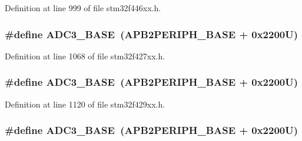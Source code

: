 Definition at line 999 of file stm32f446xx.\+h.

\subsubsection[{\texorpdfstring{A\+D\+C3\+\_\+\+B\+A\+SE}{ADC3_BASE}}]{\setlength{\rightskip}{0pt plus 5cm}\#define A\+D\+C3\+\_\+\+B\+A\+SE~({\bf A\+P\+B2\+P\+E\+R\+I\+P\+H\+\_\+\+B\+A\+SE} + 0x2200\+U)}\hypertarget{group___peripheral__memory__map_gaca766f86c8e0b00a8e2b0224dcbb4c82}{}\label{group___peripheral__memory__map_gaca766f86c8e0b00a8e2b0224dcbb4c82}


Definition at line 1068 of file stm32f427xx.\+h.

\subsubsection[{\texorpdfstring{A\+D\+C3\+\_\+\+B\+A\+SE}{ADC3_BASE}}]{\setlength{\rightskip}{0pt plus 5cm}\#define A\+D\+C3\+\_\+\+B\+A\+SE~({\bf A\+P\+B2\+P\+E\+R\+I\+P\+H\+\_\+\+B\+A\+SE} + 0x2200\+U)}\hypertarget{group___peripheral__memory__map_gaca766f86c8e0b00a8e2b0224dcbb4c82}{}\label{group___peripheral__memory__map_gaca766f86c8e0b00a8e2b0224dcbb4c82}


Definition at line 1120 of file stm32f429xx.\+h.

\subsubsection[{\texorpdfstring{A\+D\+C3\+\_\+\+B\+A\+SE}{ADC3_BASE}}]{\setlength{\rightskip}{0pt plus 5cm}\#define A\+D\+C3\+\_\+\+B\+A\+SE~({\bf A\+P\+B2\+P\+E\+R\+I\+P\+H\+\_\+\+B\+A\+SE} + 0x2200\+U)}\hypertarget{group___peripheral__memory__map_gaca766f86c8e0b00a8e2b0224dcbb4c82}{}\label{group___peripheral__memory__map_gaca766f86c8e0b00a8e2b0224dcbb4c82}


